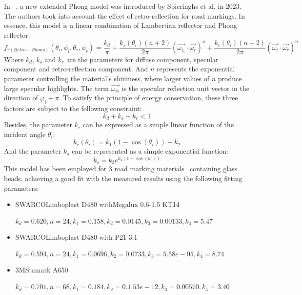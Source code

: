 In ~\cite{2023_Spieringhs}, a new extended Phong model was introduced by Spieringhs et al. in 2023.
The authors took into account the effect of retro-reflection for road markings.
In essence, this model is a linear combination of Lambertian reflector and Phong reflector:
\begin{equation}
    f_{r(Retro-Phong)}(\theta_i, \phi_i, \theta_r, \phi_r) = \frac{k_d}{\pi}%
    + \frac{k_s(\theta_i) (n + 2)}{2 \pi} \left( \overrightarrow{\omega_{i_s}} \cdot \overrightarrow{\omega_r} \right)^n%
    + \frac{k_r(\theta_i) (n + 2)}{2 \pi} \left(\overrightarrow{\omega_i} \cdot \overrightarrow{\omega_r}\right)^n
\end{equation}
Where $k_d$, $k_s$ and $k_r$ are the parameters for diffuse component, specular component and retro-reflection component.
And $n$ represents the exponential parameter controlling the material's shininess, where larger values of $n$ produce large specular highlights.
The term $\overrightarrow{\omega_{is}}$ is the specular reflection unit vector in the direction of $\varphi_i + \pi$.
To satisfy the principle of energy conservation, these three factors are subject to the following constraint:
\[
    k_d + k_s + k_r <1
\]
Besides, the parameter $k_r$ can be expressed as a simple linear function of the incident angle $\theta_i$:
\[
    k_r(\theta_i) = k_1(1-\cos(\theta_i)) + k_2
\]
And the parameter $k_s$ can be represented as a simple exponential function:
\[
    k_s = k_3 e^{k_4(1-\cos(\theta_i))}
\]
This model has been employed for 3 road marking materials~\cite{2023_Spieringhs} containing glass beads, achieving a good fit with the measured results using the following fitting parameters:
\begin{itemize}
    \item SWARCOLimboplast D480 withMegalux 0.6-1.5 KT14

          $k_d = 0.620, n = 24, k_1 = 0.158, k_2 = 0.0145, k_3 = 0.00133, k_4 = 5.47$

    \item SWARCOLimboplast D480 with P21 3:1

          $k_d = 0.594, n = 24, k_1 = 0.0696, k_2 = 0.0733, k_3 = 5.58e-05, k_4 = 8.74$

    \item 3MStamark A650

          $k_d = 0.701, n = 68, k_1 = 0.184, k_2 = 0.1.53e-12, k_3 = 0.00570, k_4 = 3.40$
\end{itemize}


